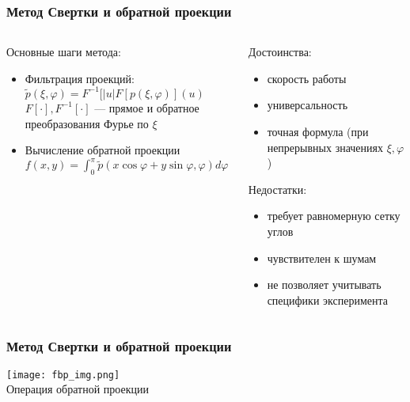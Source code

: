 \begin{frame}
\frametitle{Метод Свертки и обратной проекции}
\begin{columns}
  \hspace{-0.1cm}
  \begin{column}{0.6\textwidth}
    Основные шаги метода:
    \begin{itemize}
    \item Фильтрация проекций: $\tilde{p}(\xi, \varphi) = F^{-1}[|u|F[p(\xi, \varphi)](u)$\\
    $F[\cdot], F^{-1}[\cdot]$ --- прямое и обратное преобразования Фурье по $\xi$\\
    \vspace{10pt}
    \item Вычисление обратной проекции $f(x,y) = \int_0^\pi {\tilde{p} (x \cos\varphi + y \sin \varphi, \varphi) d\varphi}$
    \end{itemize}
  \end{column}

  \begin{column}{0.6\textwidth}
  Достоинства:
  \begin{itemize}
    \item скорость работы
    \item универсальность
    \item точная формула (при непрерывных значениях $\xi, \varphi$)
  \end{itemize}
  Недостатки:
  \begin{itemize}
    \item требует равномерную сетку углов
    \item чувствителен к шумам
    \item не позволяет учитывать специфики эксперимента
  \end{itemize}
  \end{column}
\end{columns}
\end{frame}

\begin{frame}
\centering
\frametitle{Метод Свертки и обратной проекции}
  \texttt{[image: fbp\_img.png]}
  \\
  Операция обратной проекции
\end{frame}


